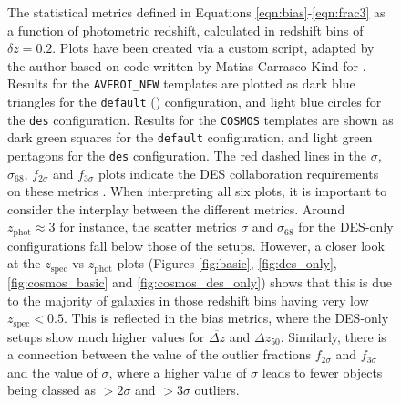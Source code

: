 \begin{figure}[!htp]
\caption[Accuracy metrics as a function of photometric redshift between \texorpdfstring{$0<z_{\mathrm{phot}}<6.5$}{}]{The  statistical  metrics  defined  in  Equations \ref{eqn:bias}-\ref{eqn:frac3} as  a  function of photometric redshift,  calculated in redshift bins of $\delta z=  0.2$. Plots have been created via a custom script, adapted by the author based on code written by Matias Carrasco Kind for \cite{2014MNRAS.445.1482S}. Results for the \texttt{AVEROI\_NEW} templates  are  plotted  as  dark  blue  triangles  for  the \texttt{default} (\DESVIDEO) configuration, and light blue circles for the \texttt{des} configuration. Results for the \texttt{COSMOS} templates are shown as dark green squares for the \texttt{default} configuration, and light green pentagons for the \texttt{des} configuration. The red dashed lines in the $\sigma$, $\sigma_{68}$, $f_{2\sigma}$ and $f_{3\sigma}$ plots indicate the DES collaboration requirements on these metrics \citep{2014MNRAS.445.1482S}. When interpreting all six plots, it is important to consider the interplay between the different metrics. Around $z_{\mathrm{phot}} \approx 3$ for instance, the scatter metrics $\sigma$ and $\sigma_{68}$ for the DES-only configurations fall below those of the \DESVIDEO setups. However, a closer look at the $z_{\mathrm{spec}}$ vs $z_{\mathrm{phot}}$ plots (Figures \ref{fig:basic}, \ref{fig:des_only}, \ref{fig:cosmos_basic} and \ref{fig:cosmos_des_only}) shows that this is due to the majority of galaxies in those redshift bins having very low $z_{\mathrm{spec}}<0.5$. This is reflected in the bias metrics, where the DES-only setups show much higher values for $\overbar{\Delta z}$ and $\Delta z_{50}$. Similarly, there is a connection between the value of the outlier fractions $f_{2\sigma}$ and $f_{3\sigma}$ and the value of $\sigma$, where a higher value of $\sigma$ leads to fewer objects being classed as $>2\sigma$ and $>3\sigma$ outliers.}
\label{fig:photoz_long}
\end{figure}

%


